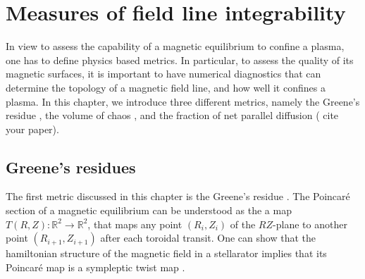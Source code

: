 \documentclass[my_thesis.tex]{subfiles}
\begin{document}
\chapter{Measures of field line integrability}

In view to assess the capability of a magnetic equilibrium to confine a plasma, one has to define physics based metrics. In particular, to assess the quality of its 
magnetic surfaces, it is important to have numerical diagnostics that can determine the topology of a magnetic field line, and how well it confines a plasma. In this chapter, we introduce three different metrics, namely the Greene's residue \citep{Greene1968,Greene1978}, the volume of chaos \citep{Loizu2017}, and the fraction of net parallel diffusion ({\color{red} cite your paper}).

\section{Greene's residues}
The first metric discussed in this chapter is the Greene's residue  \citep{Greene1968,Greene1978}. The Poincar\'e section of a magnetic equilibrium can be understood as the a map $T(R,Z):\mathbb{R}^2\rightarrow\mathbb{R}^2$, that maps any point $(R_i,Z_i)$ of the $RZ$-plane to another point $(R_{i+1},Z_{i+1})$ after each toroidal transit. One can show that the hamiltonian structure of the magnetic field in a stellarator implies that its Poincar\'e map is a sympleptic twist map \citep{Meiss1992c}. 
\end{document}
